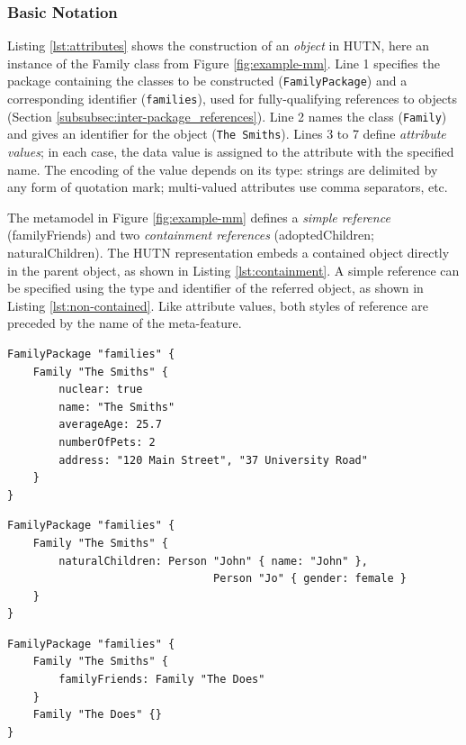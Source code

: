 \subsubsection{Basic Notation}
Listing \ref{lst:attributes} shows the construction of an \emph{object} in HUTN, here an instance of the Family class from Figure \ref{fig:example-mm}. Line 1 specifies the package containing the classes to be constructed (\texttt{FamilyPackage}) and a corresponding identifier (\texttt{families}), used for fully-qualifying references to objects (Section \ref{subsubsec:inter-package_references}). Line 2 names the class (\texttt{Family}) and gives an identifier for the object (\texttt{The Smiths}). Lines 3 to 7 define \emph{attribute values}; in each case, the data value is assigned to the attribute with the specified name. The encoding of the value depends on its type: strings are delimited by any form of quotation mark; multi-valued attributes use comma separators, etc.

The metamodel in Figure \ref{fig:example-mm} defines a \emph{simple reference} (familyFriends) and two \emph{containment references} (adoptedChildren; naturalChildren). The HUTN representation embeds a contained object directly in the parent object, as shown in Listing \ref{lst:containment}. A simple reference can be specified using the type and identifier of the referred object, as shown in Listing \ref{lst:non-contained}. Like attribute values, both styles of reference are preceded by the name of the meta-feature.

\begin{lstlisting}[caption=Specifying attributes with HUTN., label=lst:attributes, language=HutnFamilies]
FamilyPackage "families" {
    Family "The Smiths" {
        nuclear: true
        name: "The Smiths"
        averageAge: 25.7
        numberOfPets: 2
        address: "120 Main Street", "37 University Road"
    }
}
\end{lstlisting}

\begin{lstlisting}[caption=Instantiation of naturalChildren -- a HUTN containment reference., label=lst:containment, language=HutnFamilies]
FamilyPackage "families" {
    Family "The Smiths" {
        naturalChildren: Person "John" { name: "John" },
                                Person "Jo" { gender: female }
    }
}
\end{lstlisting}


\begin{lstlisting}[caption=Specifying a simple reference with HUTN., label=lst:non-contained, language=HutnFamilies]
FamilyPackage "families" {
    Family "The Smiths" {
        familyFriends: Family "The Does"
    }
    Family "The Does" {}
}
\end{lstlisting}


